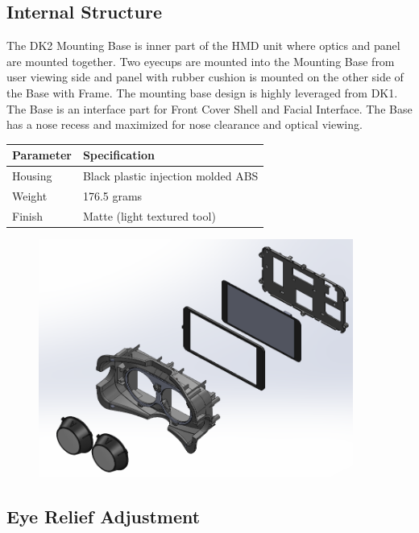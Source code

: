 \documentclass[letterpaper]{article}
\begin{document}
\subsection{Internal Structure}
The DK2 Mounting Base is inner part of the HMD unit where optics and panel are mounted together. Two eyecups are mounted into the Mounting Base from user viewing side and panel with rubber cushion is mounted on the other side of the Base with Frame. 
The mounting base design is highly leveraged from DK1. The Base is an interface part for Front Cover Shell and Facial Interface. The Base has a nose recess and maximized for nose clearance and optical viewing.

\begin{center}
    \begin{tabular}{ | l | p{8cm} |}
    \hline
    \cellcolor{lightgray} Parameter & \cellcolor{lightgray} Specification \\ \hline
    Housing & Black plastic injection molded ABS \\ \hline
    Weight & 176.5 grams \\ \hline
    Finish & Matte (light textured tool) \\ \hline
    \end{tabular}
\end{center}

\begin{figure}[H]  
  \centering
    \includegraphics[width=0.92\textwidth]{Figures/image8-29.png}
\end{figure}

\subsection{Eye Relief Adjustment}
\end{document}
